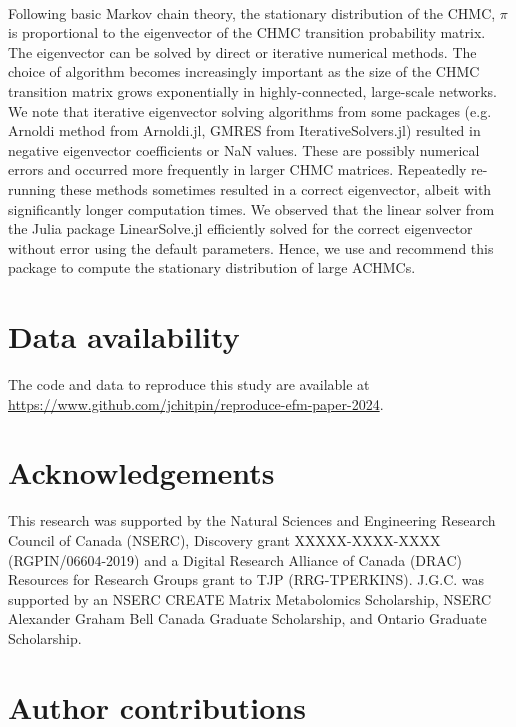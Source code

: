 \documentclass[12pt]{article}
\begin{document}
\hspace*{0.1cm}\\\noindent

Following basic Markov chain theory, the stationary distribution of the
CHMC, $\pi$ is proportional to the eigenvector of the CHMC transition
probability matrix. The eigenvector can be solved by direct or iterative
numerical methods. The choice of algorithm becomes increasingly important
as the size of the CHMC transition matrix grows exponentially in
highly-connected, large-scale networks. We note that iterative eigenvector
solving algorithms from some packages (e.g. Arnoldi method from
Arnoldi.jl, GMRES from IterativeSolvers.jl) resulted in negative
eigenvector coefficients or NaN values. These are possibly numerical
errors and occurred more frequently in larger CHMC matrices. Repeatedly
re-running these methods sometimes resulted in a correct eigenvector,
albeit with significantly longer computation times. We observed that the
linear solver from the Julia package LinearSolve.jl efficiently solved for
the correct eigenvector without error using the default parameters. Hence,
we use and recommend this package to compute the stationary distribution
of large ACHMCs.

\fi

\section*{Data availability}

The code and data to reproduce this study are available at\\
\url{https://www.github.com/jchitpin/reproduce-efm-paper-2024}.

\section*{Acknowledgements}

This research was supported by the Natural Sciences and Engineering Research Council of Canada (NSERC), Discovery grant XXXXX-XXXX-XXXX (RGPIN/06604-2019) and a Digital Research Alliance of Canada (DRAC) Resources for Research Groups grant to TJP (RRG-TPERKINS). J.G.C. was supported by an NSERC CREATE Matrix Metabolomics Scholarship, NSERC Alexander Graham Bell Canada Graduate Scholarship, and Ontario Graduate Scholarship.

\section*{Author contributions}
\end{document}
